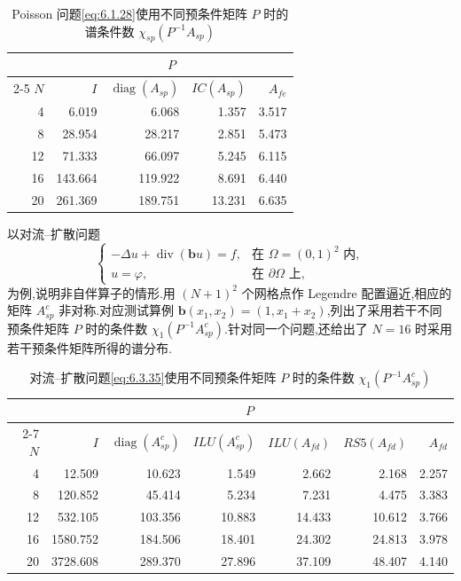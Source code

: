 \begin{table}[!htbp]
  \centering
  \caption{Poisson 问题\eqref{eq:6.1.28}使用不同预条件矩阵 \(P\) 时的谱条件数 \(\chi_{sp}(P^{-1}A_{sp})\)}\label{tab:6.3.3}
  \begin{tabular}{rrrrr}
    \toprule
    &\multicolumn{4}{c}{\(P\)}\\
    \cmidrule(lr){2-5}
    \(N\)&\(I\)&\(\operatorname{diag}(A_{sp})\)&\(IC(A_{sp})\)&\(A_{fe}\)\\
    \midrule
     4 & 6.019 & 6.068 & 1.357 & 3.517\\
     8 & 28.954 & 28.217 & 2.851 & 5.473\\
    12 & 71.333 & 66.097 & 5.245 & 6.115\\
    16 & 143.664 & 119.922 & 8.691 & 6.440\\
    20 & 261.369 & 189.751 & 13.231 & 6.635\\
    \bottomrule
  \end{tabular}
\end{table}

\begin{example}[非自伴算子的配置逼近]\label{ex:6.3-advection}
以对流--扩散问题
\begin{equation}\label{eq:6.3.35}
  \begin{cases}
    -\Delta u+\operatorname{div}(\boldsymbol{b}u)=f,&\text{在 }\Omega=(0,1)^2\text{ 内},\\
    u=\varphi,&\text{在 }\partial\Omega\text{ 上},
  \end{cases}
\end{equation}
为例,说明非自伴算子的情形.用 \((N+1)^2\) 个网格点作 Legendre 配置逼近,相应的矩阵 \(A_{sp}^c\) 非对称.对应测试算例 \(\boldsymbol{b}(x_1,x_2)=(1,x_1+x_2)\),列出了采用若干不同预条件矩阵 \(P\) 时的条件数 \(\chi_1(P^{-1}A_{sp}^c)\).针对同一个问题,还给出了 \(N=16\) 时采用若干预条件矩阵所得的谱分布.
\end{example}

\begin{table}[!htbp]
  \centering
  \caption{对流--扩散问题\eqref{eq:6.3.35}使用不同预条件矩阵 \(P\) 时的条件数 \(\chi_1(P^{-1}A_{sp}^c)\)}\label{tab:6.3.4}
  \begin{tabular}{rrrrrrr}
    \toprule
    &\multicolumn{6}{c}{\(P\)}\\
    \cmidrule(lr){2-7}
    \(N\)&\(I\)&\(\operatorname{diag}(A_{sp}^c)\)&\(ILU(A_{sp}^c)\)&\(ILU(A_{fd})\)&\(RS5(A_{fd})\)&\(A_{fd}\)\\
    \midrule
     4 & 12.509 & 10.623 & 1.549 & 2.662 & 2.168 & 2.257\\
     8 & 120.852 & 45.414 & 5.234 & 7.231 & 4.475 & 3.383\\
    12 & 532.105 & 103.356 & 10.883 & 14.433 & 10.612 & 3.766\\
    16 & 1580.752 & 184.506 & 18.401 & 24.302 & 24.813 & 3.978\\
    20 & 3728.608 & 289.370 & 27.896 & 37.109 & 48.407 & 4.140\\
    \bottomrule
  \end{tabular}
\end{table}

